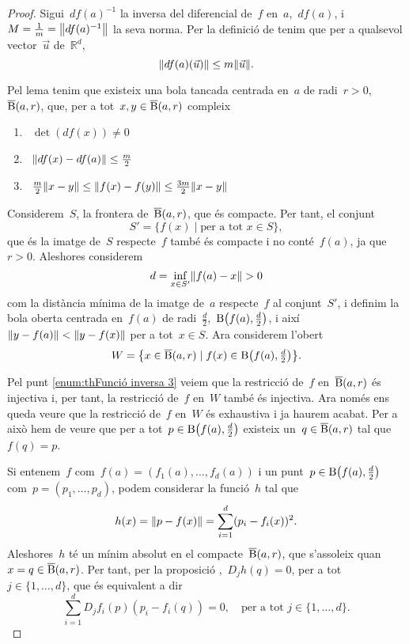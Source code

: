 \documentclass[../../main.tex]{subfiles}
\begin{document}
    \begin{proof}
        Sigui~\(df(a)^{-1}\) la inversa del diferencial de~\(f\) en~\(a\),~\(df(a)\), i~\(M=\frac{1}{m}=\norm{df(a)^{-1}}\) la seva norma.
        Per la definició de  tenim que per a qualsevol vector~\(\vec{u}\) de~\(\mathbb{R}^{d}\),
        \[
            \norm{df(a)(\vec{u})}\leq m\norm{\vec{u}}.
        \]

        Pel lema  tenim que existeix una bola tancada centrada en~\(a\) de radi~\(r>0\),~\(\overline{\operatorname{B}}(a,r)\), que, per a tot~\(x,y\in\overline{\operatorname{B}}(a,r)\) compleix
        \begin{enumerate}
            \item\label{enum:thFunció inversa 1}~\(\det(df(x))\neq0\)
            \item\label{enum:thFunció inversa 2}~\(\norm{df(x)-df(a)}\leq\frac{m}{2}\)
            \item\label{enum:thFunció inversa 3}~\(\frac{m}{2}\norm{x-y} \leq\norm{f(x)-f(y)}\leq\frac{3m}{2}\norm{x-y}\)
        \end{enumerate}

        Considerem~\(S\), la frontera de~\(\overline{\operatorname{B}}(a,r)\), que és compacte.
        Per tant, el conjunt
        \[
            S'=\{f(x)\mid\text{per a tot }x\in S\},
        \]
        que és la imatge de~\(S\) respecte~\(f\) també és compacte i no conté~\(f(a)\), ja que~\(r>0\).
        Aleshores considerem
        \[
            d=\inf_{x\in S'}\norm{f(a)-x}>0
        \]
        com la distància mínima de la imatge de~\(a\) respecte~\(f\) al conjunt~\(S'\), i definim la bola oberta centrada en~\(f(a)\) de radi~\(\frac{d}{2}\),~\(\B\left(f(a),\tfrac{d}{2}\right)\), i així~\(\norm{y-f(a)}<\norm{y-f(x)}\) per a tot~\(x\in S\).
        Ara considerem l'obert
        \[
            W=\left\{x\in\overline{\B}(a,r)\mid f(x)\in\B\left(f(a),\tfrac{d}{2}\right)\right\}.
        \]

        Pel punt \eqref{enum:thFunció inversa 3} veiem que la restricció de~\(f\) en~\(\overline{\operatorname{B}}(a,r)\) és injectiva i, per tant, la restricció de~\(f\) en~\(W\) també és injectiva.
        Ara només ens queda veure que la restricció de~\(f\) en~\(W\) és exhaustiva i ja haurem acabat.
        Per a això hem de veure que per a tot~\(p\in\B\left(f(a),\tfrac{d}{2}\right)\) existeix un~\(q\in\overline{\operatorname{B}}(a,r)\) tal que~\(f(q)=p\).

        Si entenem~\(f\) com~\(f(a)=(f_{1}(a),\dots,f_{d}(a))\) i un punt~\(p\in\B\left(f(a),\tfrac{d}{2}\right)\) com~\(p=(p_{1},\dots,p_{d})\), podem considerar la funció~\(h\) tal que
        \[
            h(x)=\norm{p-f(x)}=\sum_{i=1}^{d}(p_{i}-f_{i}(x))^{2}.
        \]
        Aleshores~\(h\) té un mínim absolut en el compacte~\(\overline{\operatorname{B}}(a,r)\), que s'assoleix quan~\(x=q\in\overline{\operatorname{B}}(a,r)\).
        Per tant, per la proposició ,~\(D_{j}h(q)=0\), per a tot~\(j\in\{1,\dots,d\}\), que és equivalent a dir
        \[
            \sum_{i=1}^{d}D_{j}f_{i}(p)(p_{i}-f_{i}(q))=0,\quad\text{per a tot }j\in\{1,\dots,d\}.
        \]


\end{proof}
\end{document}
